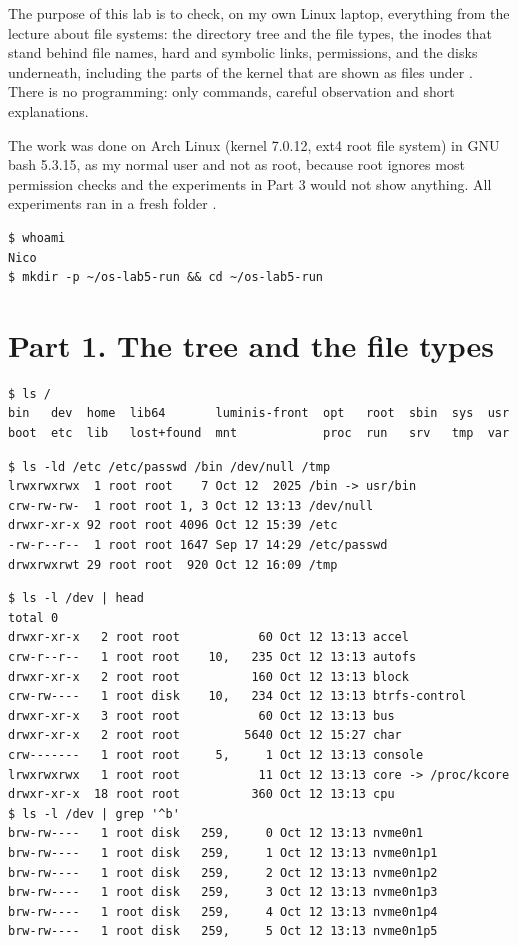 \documentclass[11pt,a4paper]{article}
\begin{document}
\utmtitlepage
\tableofcontents
\newpage


The purpose of this lab is to check, on my own Linux laptop, everything from the lecture about
file systems: the directory tree and the file types, the inodes that stand behind file names,
hard and symbolic links, permissions, and the disks underneath, including the parts of the kernel
that are shown as files under . There is no programming: only commands, careful
observation and short explanations.

The work was done on Arch Linux (kernel 7.0.12, ext4 root file system) in GNU bash 5.3.15, as my
normal user and not as root, because root ignores most permission checks and the experiments in
Part 3 would not show anything. All experiments ran in a fresh folder .

\begin{lstlisting}
$ whoami
Nico
$ mkdir -p ~/os-lab5-run && cd ~/os-lab5-run
\end{lstlisting}

\section{Part 1. The tree and the file types}

\begin{lstlisting}[caption={The root of the tree}]
$ ls /
bin   dev  home  lib64       luminis-front  opt   root  sbin  sys  usr
boot  etc  lib   lost+found  mnt            proc  run   srv   tmp  var
\end{lstlisting}

\begin{lstlisting}[caption={The type of five paths}]
$ ls -ld /etc /etc/passwd /bin /dev/null /tmp
lrwxrwxrwx  1 root root    7 Oct 12  2025 /bin -> usr/bin
crw-rw-rw-  1 root root 1, 3 Oct 12 13:13 /dev/null
drwxr-xr-x 92 root root 4096 Oct 12 15:39 /etc
-rw-r--r--  1 root root 1647 Sep 17 14:29 /etc/passwd
drwxrwxrwt 29 root root  920 Oct 12 16:09 /tmp
\end{lstlisting}

\begin{lstlisting}[caption={Devices in /dev}]
$ ls -l /dev | head
total 0
drwxr-xr-x   2 root root           60 Oct 12 13:13 accel
crw-r--r--   1 root root    10,   235 Oct 12 13:13 autofs
drwxr-xr-x   2 root root          160 Oct 12 13:13 block
crw-rw----   1 root disk    10,   234 Oct 12 13:13 btrfs-control
drwxr-xr-x   3 root root           60 Oct 12 13:13 bus
drwxr-xr-x   2 root root         5640 Oct 12 15:27 char
crw-------   1 root root     5,     1 Oct 12 13:13 console
lrwxrwxrwx   1 root root           11 Oct 12 13:13 core -> /proc/kcore
drwxr-xr-x  18 root root          360 Oct 12 13:13 cpu
$ ls -l /dev | grep '^b'
brw-rw----   1 root disk   259,     0 Oct 12 13:13 nvme0n1
brw-rw----   1 root disk   259,     1 Oct 12 13:13 nvme0n1p1
brw-rw----   1 root disk   259,     2 Oct 12 13:13 nvme0n1p2
brw-rw----   1 root disk   259,     3 Oct 12 13:13 nvme0n1p3
brw-rw----   1 root disk   259,     4 Oct 12 13:13 nvme0n1p4
brw-rw----   1 root disk   259,     5 Oct 12 13:13 nvme0n1p5
\end{lstlisting}
\end{document}
